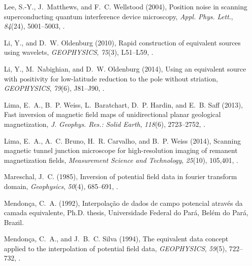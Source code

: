 \documentclass[draft,gc]{agutex}
\begin{document}
\begin{article}
\begin{thebibliography}{39}
Lee, S.-Y., J.~Matthews, and F.~C. Wellstood (2004), Position noise in scanning
  superconducting quantum interference device microscopy, \textit{Appl. Phys.
  Lett.}, \textit{84}(24), 5001--5003, .

Li, Y., and D.~W. Oldenburg (2010), Rapid construction of equivalent sources
  using wavelets, \textit{GEOPHYSICS}, \textit{75}(3), L51--L59,
  .

Li, Y., M.~Nabighian, and D.~W. Oldenburg (2014), Using an equivalent source
  with positivity for low-latitude reduction to the pole without striation,
  \textit{GEOPHYSICS}, \textit{79}(6), J81--J90, .

Lima, E.~A., B.~P. Weiss, L.~Baratchart, D.~P. Hardin, and E.~B. Saff (2013),
  Fast inversion of magnetic field maps of unidirectional planar geological
  magnetization, \textit{J. Geophys. Res.: Solid Earth}, \textit{118}(6),
  2723--2752, .

Lima, E.~A., A.~C. Bruno, H.~R. Carvalho, and B.~P. Weiss (2014), Scanning
  magnetic tunnel junction microscope for high-resolution imaging of remanent
  magnetization fields, \textit{Measurement Science and Technology},
  \textit{25}(10), 105,401, .

Mareschal, J.~C. (1985), Inversion of potential field data in fourier transform
  domain, \textit{Geophysics}, \textit{50}(4), 685--691,
  .

Mendon\c{c}a, C.~A. (1992), Interpola\c{c}\~{a}o de dados de campo potencial
  atrav\'{e}s da camada equivalente, Ph.D. thesis, Universidade Federal do
  Par\'{a}, Bel\'{e}m do Par\'{a}, Brazil.

Mendon\c{c}a, C.~A., and J.~B.~C. Silva (1994), The equivalent data concept
  applied to the interpolation of potential field data, \textit{GEOPHYSICS},
  \textit{59}(5), 722--732, .


\end{thebibliography}
\end{article}
\end{document}
